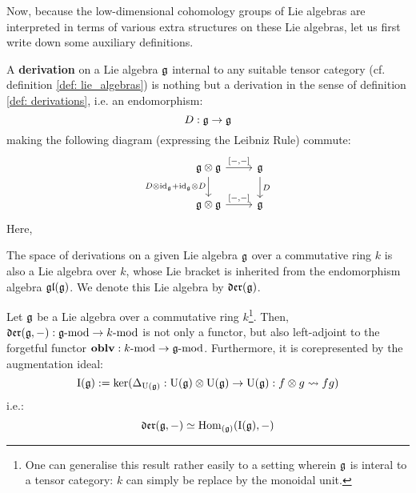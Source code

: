                     Now, because the low-dimensional cohomology groups of Lie algebras are interpreted in terms of various extra structures on these Lie algebras, let us first write down some auxiliary definitions.
                    \begin{definition} \label{def: lie_algebra_derivations}
                        A \textbf{derivation} on a Lie algebra $\mathfrak{g}$ internal to any suitable tensor category (cf. definition \ref{def: lie_algebras}) is nothing but a derivation in the sense of definition \ref{def: derivations}, i.e. an endomorphism:
                            $$D: \mathfrak{g} \to \mathfrak{g}$$
                        making the following diagram (expressing the Leibniz Rule) commute:
                            $$
                                \begin{tikzcd}
                                	{\g \tensor \g} & \g \\
                                	{\g \tensor \g} & {\g}
                                	\arrow["{D \tensor \id_{\g} + \id_{\g} \tensor D}"', from=1-1, to=2-1]
                                	\arrow["{[-,-]}", from=2-1, to=2-2]
                                	\arrow["{[-,-]}", from=1-1, to=1-2]
                                	\arrow["D", from=1-2, to=2-2]
                                \end{tikzcd}
                            $$
                        Here, 
                    \end{definition}
                    \begin{remark}
                        The space of derivations on a given Lie algebra $\mathfrak{g}$ over a commutative ring $k$ is also a Lie algebra over $k$, whose Lie bracket is inherited from the endomorphism algebra $\mathfrak{gl}(\mathfrak{g})$. We denote this Lie algebra by $\mathfrak{der}(\mathfrak{g})$.
                    \end{remark}
                    \begin{proposition} \label{prop: lie_algebra_derivations_universal_property}
                        Let $\mathfrak{g}$ be a Lie algebra over a commutative ring $k$\footnote{One can generalise this result rather easily to a setting wherein $\mathfrak{g}$ is interal to a tensor category: $k$ can simply be replace by the monoidal unit.}. Then, $\mathfrak{der}(\mathfrak{g}, -): \mathfrak{g}\text{-}\mathrm{mod} \to k\text{-}\mathrm{mod}$ is not only a functor, but also left-adjoint to the forgetful functor $\mathbf{oblv}: k\text{-}\mathrm{mod} \to \mathfrak{g}\text{-}\mathrm{mod}$. Furthermore, it is corepresented by the augmentation ideal:
                            $$\rmI(\g) := \ker(\Delta_{\U(\g)}: \U(\g) \tensor \U(\g) \to \U(\g): f \tensor g \mapsto fg)$$
                        i.e.:
                            $$\mathfrak{der}(\mathfrak{g}, -) \simeq \mathrm{Hom}_{(\mathfrak{g})}(\mathrm{I}(\mathfrak{g}), -)$$
                    \end{proposition}
